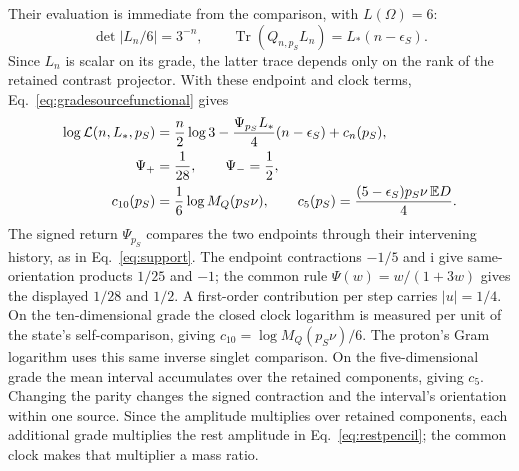 \documentclass[aps,prx,onecolumn,10pt,notitlepage,nofootinbib,longbibliography]{revtex4-2}
\numberwithin{equation}{section}
\numberwithin{table}{section}
\newcommand{\EE}{\mathbb E}
\newcommand{\Tr}{\operatorname{Tr}}
\newcommand{\ii}{\mathrm i}
\begin{document}
Their evaluation is immediate from the comparison, with $L(\Omega)=6$:
\begin{equation}
 \det|L_n/6|=3^{-n},\qquad
 \Tr(Q_{n,p_S}L_n)=L_*(n-\epsilon_S).
 \label{eq:gradecontractions}
\end{equation}
Since $L_n$ is scalar on its grade, the latter trace depends only on the rank of the retained contrast projector. With these endpoint and clock terms, Eq.~\eqref{eq:gradesourcefunctional} gives
\begin{align}
 \log\mathcal L(n,L_*,p_S)
 &=\frac n2\log3-\frac{\Psi_{p_S} L_*}{4}(n-\epsilon_S)+c_n(p_S),\notag\\
 \Psi_+&=\frac1{28},\qquad \Psi_- =\frac12,\notag\\
 c_{10}(p_S)&=\frac16\log M_Q(p_S\nu),\qquad
 c_5(p_S)=\frac{(5-\epsilon_S)p_S\nu\,\EE D}{4}.
 \label{eq:layers}
\end{align}
The signed return $\Psi_{p_S}$ compares the two endpoints through their intervening history, as in Eq.~\eqref{eq:support}. The endpoint contractions $-1/5$ and $\ii$ give same-orientation products $1/25$ and $-1$; the common rule $\Psi(w)=w/(1+3w)$ gives the displayed $1/28$ and $1/2$. A first-order contribution per step carries $|u|=1/4$. On the ten-dimensional grade the closed clock logarithm is measured per unit of the state's self-comparison, giving $c_{10}=\log M_Q(p_S\nu)/6$. The proton's Gram logarithm uses this same inverse singlet comparison. On the five-dimensional grade the mean interval accumulates over the retained components, giving $c_5$. Changing the parity changes the signed contraction and the interval's orientation within one source. Since the amplitude multiplies over retained components, each additional grade multiplies the rest amplitude in Eq.~\eqref{eq:restpencil}; the common clock makes that multiplier a mass ratio.
\end{document}

